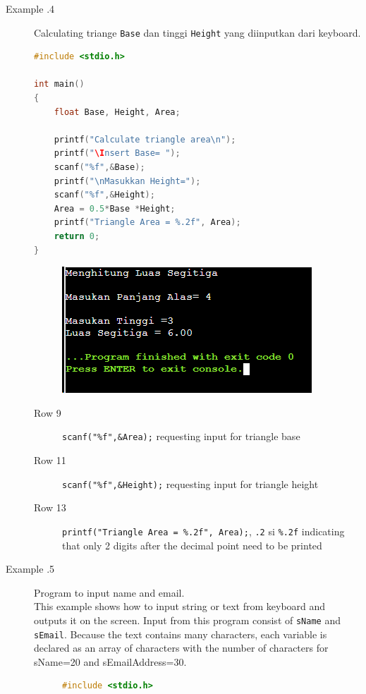 \begin{description}
	\item  [Example \thesubsection.4] Calculating triange \verb*|Base|   dan tinggi \verb*|Height| yang diinputkan dari keyboard.
	      \begin{lstlisting}[language=c]
#include <stdio.h>

int main()
{
	float Base, Height, Area;
	
	printf("Calculate triangle area\n");
	printf("\Insert Base= ");
	scanf("%f",&Base);
	printf("\nMasukkan Height=");
	scanf("%f",&Height);
	Area = 0.5*Base *Height;
	printf("Triangle Area = %.2f", Area);
	return 0;
}
	\end{lstlisting}
	      \begin{figure}[H]
		      \centering
		      \includegraphics[width=0.5\linewidth]{P1/img/screenshot0005.png}
		      \caption{}
		      \label{fig:screenshot0005}
	      \end{figure}

	      \begin{description}
		      \item [Row 9]\verb|scanf("%f",&Area);| requesting input for triangle base
		      \item [Row 11]\verb|scanf("%f",&Height);| requesting input for triangle height
		      \item [Row 13]\verb|printf("Triangle Area = %.2f", Area);|,  \verb|.2| si \verb|%.2f| indicating that only 2 digits after the decimal point need to be printed
	      \end{description}

	\item[Example \thesubsection.5] Program to input name and email.\\
		This example shows how to input string or text from keyboard and outputs it on the screen. Input from this program consist of \verb|sName| and \verb|sEmail|. Because the text contains many characters, each variable is declared as an array of characters with the number of characters for sName=20 and sEmailAddress=30.
		\begin{figure}[H]
			\begin{lstlisting}[language=c]
		#include <stdio.h>
		

\end{lstlisting}
\end{figure}
\end{description}
